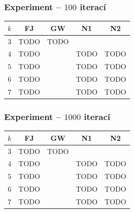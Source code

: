 \subsubsection*{Experiment -- $100$ iterací}
\begin{center}
    \begin{tabular}{ c c c c c }
    $k$ & FJ         & GW                  & N1                  & N2         \\
    \hline
    $3$ & TODO       & TODO                &                     &            \\  
    $4$ & TODO       &                     & TODO                & TODO       \\
    $5$ & TODO       &                     & TODO                & TODO       \\
    $6$ & TODO       &                     & TODO                & TODO       \\
    $7$ & TODO       &                     & TODO                & TODO       \\
    \end{tabular}
\end{center}


\subsubsection*{Experiment -- $1000$ iterací}
\begin{center}
    \begin{tabular}{ c c c c c }
    $k$ & FJ         & GW                  & N1                  & N2         \\
    \hline
    $3$ & TODO       & TODO                &                     &            \\  
    $4$ & TODO       &                     & TODO                & TODO       \\
    $5$ & TODO       &                     & TODO                & TODO       \\
    $6$ & TODO       &                     & TODO                & TODO       \\
    $7$ & TODO       &                     & TODO                & TODO       \\
    \end{tabular}
\end{center}


